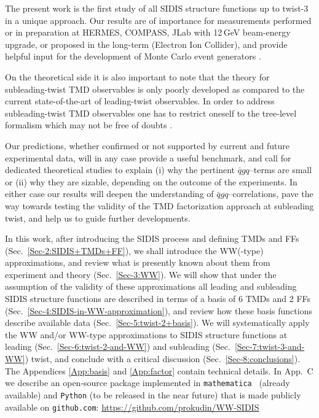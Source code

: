 \documentclass[a4paper,11pt]{article}
\newcommand{\blue}[1]{{\color{blue} #1}}
\newcommand{\ps}[1]{\blue{#1}}
\begin{document}
The present work is the first study of all SIDIS structure functions up to
twist-3 in a unique approach. Our results are of importance for measurements
performed or in preparation at HERMES, COMPASS, JLab with
12$\,$GeV beam-energy upgrade, or proposed in the long-term
(Electron Ion Collider), and provide helpful input for the
development of Monte Carlo event generators \cite{Avakian:2015vha}.

\ps{On the theoretical side it is also important to note that the
theory for subleading-twist TMD observables is only poorly developed
as compared to the current state-of-the-art of leading-twist observables.
In order to address subleading-twist TMD observables one has
to restrict oneself to the tree-level formalism
\cite{Kotzinian:1994dv,Mulders:1995dh,Boer:1997nt,Goeke:2005hb,
Bacchetta:2006tn} which may not be free of doubts
\cite{Metz:2004je,Gamberg:2006ru}.}

Our predictions, whether confirmed or not supported by current and
future experimental data, will in any case provide a useful benchmark,
and call for dedicated theoretical studies to explain (i) why the
pertinent $\bar{q}gq$--terms are small or (ii) why they are sizable,
\ps{depending on the outcome of the experiments.}
In either case our results will deepen the understanding of
$\bar{q}gq$--correlations, pave the
way towards testing the validity of the TMD factorization approach
at subleading twist, and help us to guide further developments.

In this work, after introducing the SIDIS process and defining TMDs and
FFs (Sec.~\ref{Sec-2:SIDIS+TMDs+FF}), we shall introduce the WW(-type)
approximations, and review what is presently known about them
from experiment and theory (Sec.~\ref{Sec-3:WW}).
We will show that under the assumption of the validity of these approximations
all leading and subleading SIDIS structure functions are described in terms of
a basis of 6 TMDs and 2 FFs (Sec.~\ref{Sec-4:SIDIS-in-WW-approximation}),
and review how these basis functions describe available data
(Sec.~\ref{Sec-5:twist-2+basis}).
We will systematically apply the WW and/or WW-type approximations
to SIDIS structure functions at leading (Sec.~\ref{Sec-6:twist-2-and-WW})
and subleading (Sec.~\ref{Sec-7:twist-3-and-WW}) twist, and
conclude with a critical discussion (Sec.~\ref{Sec-8:conclusions}).
The Appendices \ref{App:basis} and \ref{App:factor} contain
technical details.
	In App.~C we describe an open-source package implemented
	in \texttt{mathematica}~\cite{Mathematica} (already available)
	and \texttt{Python} (to be released in the near future) that is
	made publicly available on \texttt{github.com}: {\href{
	https://github.com/prokudin/WW-SIDIS}{
	https://github.com/prokudin/WW-SIDIS}}
\end{document}
